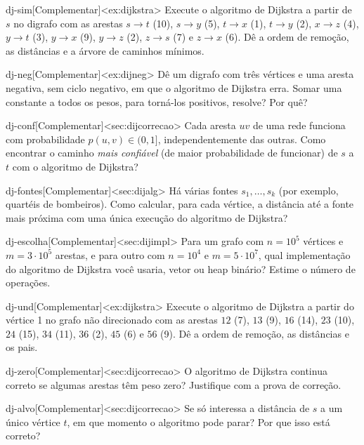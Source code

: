 \excompl
\begin{exercicio}{dj-sim}[Complementar]<ex:dijkstra>
Execute o algoritmo de Dijkstra a partir de $s$ no digrafo com as arestas $s\to t$ (10), $s\to y$ (5), $t\to x$ (1), $t\to y$ (2), $x\to z$ (4), $y\to t$ (3), $y\to x$ (9), $y\to z$ (2), $z\to s$ (7) e $z\to x$ (6). Dê a ordem de remoção, as distâncias e a árvore de caminhos mínimos.
\end{exercicio}
\begin{exercicio}{dj-neg}[Complementar]<ex:dijneg>
Dê um digrafo com três vértices e uma aresta negativa, sem ciclo negativo, em que o algoritmo de Dijkstra erra. Somar uma constante a todos os pesos, para torná-los positivos, resolve? Por quê?
\end{exercicio}
\begin{exercicio}{dj-conf}[Complementar]<sec:dijcorrecao>
Cada aresta $uv$ de uma rede funciona com probabilidade $p(u,v)\in(0,1]$, independentemente das outras. Como encontrar o caminho \emph{mais confiável} (de maior probabilidade de funcionar) de $s$ a $t$ com o algoritmo de Dijkstra?
\end{exercicio}
\begin{exercicio}{dj-fontes}[Complementar]<sec:dijalg>
Há várias fontes $s_1,\dots,s_k$ (por exemplo, quartéis de bombeiros). Como calcular, para cada vértice, a distância até a fonte mais próxima com uma única execução do algoritmo de Dijkstra?
\end{exercicio}
\begin{exercicio}{dj-escolha}[Complementar]<sec:dijimpl>
Para um grafo com $n=10^5$ vértices e $m=3\cdot10^5$ arestas, e para outro com $n=10^4$ e $m=5\cdot10^7$, qual implementação do algoritmo de Dijkstra você usaria, vetor ou heap binário? Estime o número de operações.
\end{exercicio}
\begin{exercicio}{dj-und}[Complementar]<ex:dijkstra>
Execute o algoritmo de Dijkstra a partir do vértice 1 no grafo não direcionado com as arestas $12$ (7), $13$ (9), $16$ (14), $23$ (10), $24$ (15), $34$ (11), $36$ (2), $45$ (6) e $56$ (9). Dê a ordem de remoção, as distâncias e os pais.
\end{exercicio}
\begin{exercicio}{dj-zero}[Complementar]<sec:dijcorrecao>
O algoritmo de Dijkstra continua correto se algumas arestas têm peso zero? Justifique com a prova de correção.
\end{exercicio}
\begin{exercicio}{dj-alvo}[Complementar]<sec:dijcorrecao>
Se só interessa a distância de $s$ a um único vértice $t$, em que momento o algoritmo pode parar? Por que isso está correto?
\end{exercicio}
